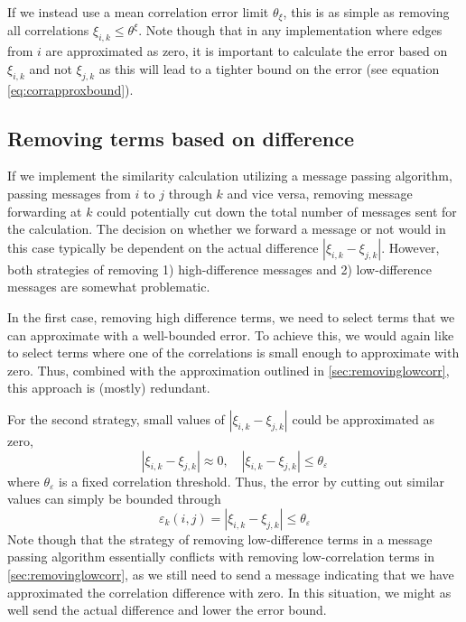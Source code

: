 \documentclass[conference]{IEEEtran}
\begin{document}
If we instead use a mean correlation error limit $\theta_\xi$, this is as simple as removing all correlations $\xi_{i,k} \leq \theta^\xi$. Note though that in any implementation where edges from $i$ are approximated as zero, it is important to calculate the error based on $\xi_{i,k}$ and not $\xi_{j,k}$ as this will lead to a tighter bound on the error (see equation \ref{eq:corrapproxbound}).

\subsection{Removing terms based on difference}

If we implement the similarity calculation utilizing a message passing algorithm, passing messages from $i$ to $j$ through $k$ and vice versa, removing message forwarding at $k$ could potentially cut down the total number of messages sent for the calculation. The decision on whether we forward a message or not would in this case typically be dependent on the actual difference $|\xi_{i,k}-\xi_{j,k}|$. However, both strategies of removing 1) high-difference messages and 2) low-difference messages are somewhat problematic.

In the first case, removing high difference terms, we need to select terms that we can approximate with a well-bounded error. To achieve this, we would again like to select terms where one of the correlations is small enough to approximate with zero. Thus, combined with the approximation outlined in \ref{sec:removinglowcorr}, this approach is (mostly) redundant.

For the second strategy, small values of $|\xi_{i,k}-\xi_{j,k}|$ could be approximated as zero,
\begin{equation}
| \xi_{i,k} - \xi_{j,k} | \approx 0, \quad | \xi_{i,k} - \xi_{j,k} | \leq \theta_\varepsilon
\end{equation}
where $\theta_\varepsilon$ is a fixed correlation threshold. Thus, the error by cutting out similar values can simply be bounded through
\begin{equation}
\varepsilon_k(i,j) = | \xi_{i,k} - \xi_{j,k} | \leq \theta_\varepsilon
\end{equation}
Note though that the strategy of removing low-difference terms in a message passing algorithm essentially conflicts with removing low-correlation terms in \ref{sec:removinglowcorr}, as we still need to send a message indicating that we have approximated the correlation difference with zero. In this situation, we might as well send the actual difference and lower the error bound.
\end{document}
